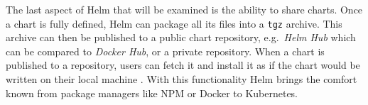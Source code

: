 The last aspect of Helm that will be examined is the ability to share 
charts. Once a chart is fully defined, Helm can package all its files into a
\texttt{tgz} archive. This archive can then be published to a public chart
repository, e.g.\ \textit{Helm Hub} which can be compared to \textit{Docker
Hub}, or a private repository. When a chart is published to a repository, users
can fetch it and install it as if the chart would be written on their local
machine \autocite{HelmDocumentationCharts}. With this functionality Helm brings
the comfort known from package managers like \ac{NPM} or Docker to Kubernetes.
